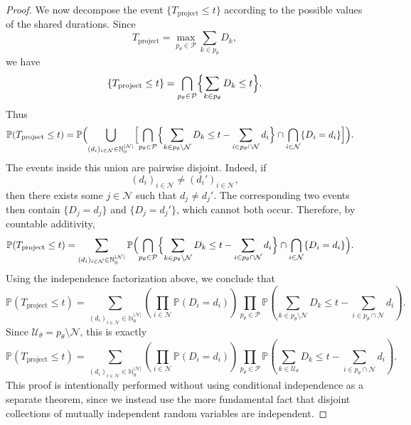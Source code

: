 \documentclass[11pt,a4paper]{article}
\newcommand{\pP}{\mathbb{P}}
\newcommand{\1}{\mathbf{1}}
\theoremstyle{definition}
\theoremstyle{plain}
\theoremstyle{remark}
\numberwithin{equation}{section}
\begin{document}
\begin{proof}
We now decompose the event $\{T_{\text{project}}\leq t\}$ according to the possible values of the shared durations. Since
\[
T_{\text{project}}
=
\max_{p_\theta\in\mathcal{P}}
\sum_{k\in p_\theta}D_k,
\]
we have
\[
\{T_{\text{project}}\leq t\}
=
\bigcap_{p_\theta \in \mathcal{P}}
\Bigl\{
\sum_{k \in p_\theta}D_k \leq t
\Bigr\}.
\]
Thus
\[
\begin{aligned}
\pP(T_{\text{project}}\leq t)
&=
\pP \Bigl(
\bigcup_{(d_i)_{i\in\mathcal{N}}\in \mathbb{N}_0^{|\mathcal{N}|}}
\Bigl[
\bigcap_{p_\theta \in \mathcal{P}}
\Bigl\{
\sum_{k \in p_\theta\setminus\mathcal{N}}D_k
\leq
t-\sum_{i \in p_\theta\cap\mathcal{N}}d_i
\Bigr\}
\cap
\bigcap_{i \in \mathcal{N}}
\{D_i=d_i\}
\Bigr]
\Bigr).
\end{aligned}
\]
The events inside this union are pairwise disjoint. Indeed, if
\[
(d_i)_{i\in\mathcal{N}}\neq (d_i')_{i\in\mathcal{N}},
\]
then there exists some $j\in\mathcal{N}$ such that $d_j\neq d_j'$. The corresponding two events then contain $\{D_j=d_j\}$ and $\{D_j=d_j'\}$, which cannot both occur. Therefore, by countable additivity,
\[
\begin{aligned}
\pP(T_{\text{project}}\leq t)
&=
\sum_{(d_i)_{i\in\mathcal{N}}\in \mathbb{N}_0^{|\mathcal{N}|}}
\pP \Bigl(
\bigcap_{p_\theta \in \mathcal{P}}
\Bigl\{
\sum_{k \in p_\theta\setminus\mathcal{N}}D_k
\leq
t-\sum_{i \in p_\theta\cap\mathcal{N}}d_i
\Bigr\}
\cap
\bigcap_{i \in \mathcal{N}}
\{D_i=d_i\}
\Bigr).
\end{aligned}
\]
Using the independence factorization above, we conclude that
\[
\pP(T_{\text{project}}\leq t)
=
\sum_{(d_i)_{i\in\mathcal{N}}\in \mathbb{N}_0^{|\mathcal{N}|}}
\left(
\prod_{i\in\mathcal{N}}\pP(D_i=d_i)
\right)
\prod_{p_\theta\in\mathcal{P}}
\pP\left(
\sum_{k\in p_\theta\setminus\mathcal{N}}D_k
\leq
t-\sum_{i\in p_\theta\cap\mathcal{N}}d_i
\right).
\]
Since $\mathcal{U}_\theta=p_\theta\setminus\mathcal{N}$, this is exactly
\[
\pP(T_{\text{project}}\leq t)
=
\sum_{(d_i)_{i\in\mathcal{N}}\in \mathbb{N}_0^{|\mathcal{N}|}}
\left(
\prod_{i\in\mathcal{N}}\pP(D_i=d_i)
\right)
\prod_{p_\theta\in\mathcal{P}}
\pP\left(
\sum_{k\in\mathcal{U}_\theta}D_k
\leq
t-\sum_{i\in p_\theta\cap\mathcal{N}}d_i
\right).
\]
This proof is intentionally performed without using conditional independence as a separate theorem, since we instead use the more fundamental fact that disjoint collections of mutually independent random variables are independent.
\end{proof}


\newpage
\end{document}

